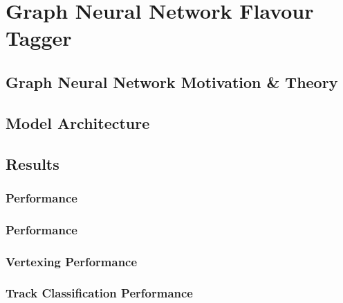\chapter{Graph Neural Network Flavour Tagger}\label{chap:gnn_tagger}


\section{Graph Neural Network Motivation \& Theory}\label{sec:gnn_motivation_theory}
\section{Model Architecture}\label{sec:gnn_arch}
\section{Results}\label{sec:gnn_results}
\subsection{\btagging Performance}\label{sec:gnn_btag_perf}
\subsection{\ctagging Performance}\label{sec:gnn_ctag_perf}
\subsection{Vertexing Performance}\label{sec:gnn_vert_perf}
\subsection{Track Classification Performance}\label{sec:gnn_tc_perf}
